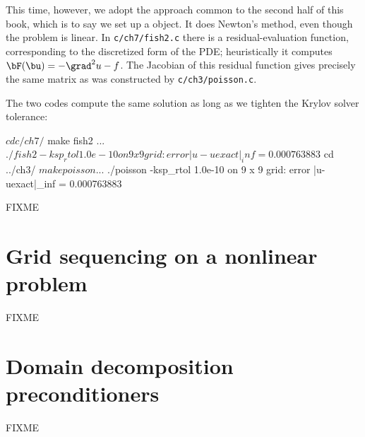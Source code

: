 This time, however, we adopt the approach common to the second half of this book, which is to say we set up a \PETSc \pSNES object.  It does Newton's method, even though the problem is linear.  In \texttt{c/ch7/fish2.c} there is a residual-evaluation function, corresponding to the discretized form of the PDE; heuristically it computes $\bF(\bu) = -\grad^2 u - f$.  The Jacobian of this residual function gives precisely the same matrix as was constructed by \texttt{c/ch3/poisson.c}.

The two codes compute the same solution as long as we tighten the Krylov solver tolerance:
\begin{cline}
$ cd c/ch7/
$ make fish2
...
$ ./fish2 -ksp_rtol 1.0e-10
on 9 x 9 grid:  error |u-uexact|_inf = 0.000763883
$ cd ../ch3/
$ make poisson
...
$ ./poisson -ksp_rtol 1.0e-10
on 9 x 9 grid:  error |u-uexact|_inf = 0.000763883
\end{cline}

FIXME

\section{Grid sequencing on a nonlinear problem}

FIXME

\section{Domain decomposition preconditioners}

FIXME

%
%


